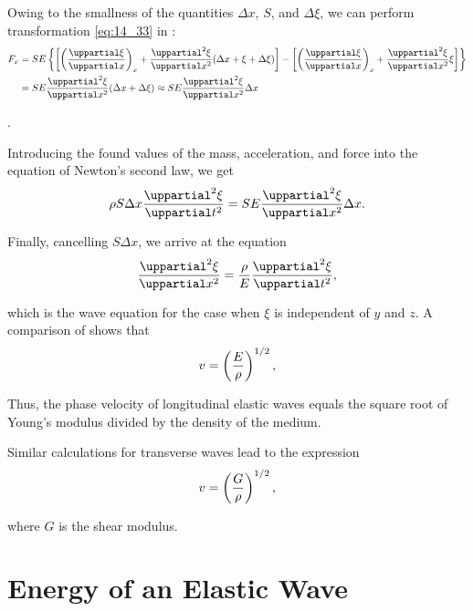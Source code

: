 Owing to the smallness of the quantities $\Delta{x}$, $S$, and $\Delta{\xi}$, we can perform transformation \eqref{eq:14_33} in :
\begin{align}
	F_x &= SE \bracet{
	\bracket{
	\parenthesis{ \diffpartial{\xi}{x} }_{x}  + \diffnpartial{\xi}{x}{2} (\Delta{x}+\xi+\Delta{\xi})
	} -
	\bracket{
	\parenthesis{ \diffpartial{\xi}{x} }_{x} + \diffnpartial{\xi}{x}{2} \xi
	}
	}\nonumber\\
	&= SE \diffnpartial{\xi}{x}{2} (\Delta{x} + \Delta{\xi}) \approx SE \diffnpartial{\xi}{x}{2} \Delta{x} \label{eq:14_34}
\end{align}

.

Introducing the found values of the mass, acceleration, and force into the equation of Newton's second law, we get
\begin{equation*}
	\rho S \Delta{x} \diffnpartial{\xi}{t}{2} = SE \diffnpartial{\xi}{x}{2} \Delta{x}.
\end{equation*}

\noindent
Finally, cancelling $S\Delta{x}$, we arrive at the equation
\begin{equation}\label{eq:14_35}
	\diffnpartial{\xi}{x}{2} = \frac{\rho}{E} \diffnpartial{\xi}{t}{2},
\end{equation}

\noindent
which is the wave equation for the case when $\xi$ is independent of $y$ and $z$.
A comparison of  shows that
\begin{equation}\label{eq:14_36}
	v = \left(\frac{E}{\rho}\right)^{1/2},
\end{equation}

\noindent
Thus, the phase velocity of longitudinal elastic waves equals the square root of Young's modulus divided by the density of the medium.

Similar calculations for transverse waves lead to the expression
\begin{equation}\label{eq:14_37}
	v = \left(\frac{G}{\rho}\right)^{1/2},
\end{equation}

\noindent
where $G$ is the shear modulus.

\section{Energy of an Elastic Wave}\label{sec:14_6}


